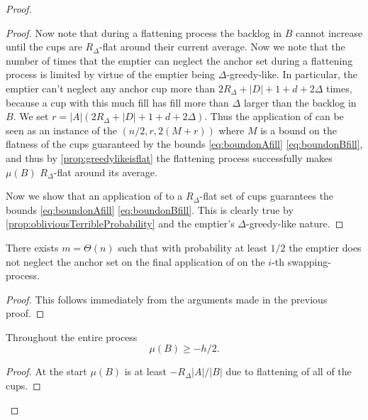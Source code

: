 \begin{proof}
\begin{proof}
  Now note that during a flattening process the backlog in $B$
  cannot increase until the cups are $R_\Delta$-flat around their
  current average. Now we note that the number of times that the
  emptier can neglect the anchor set during a flattening process
  is limited by virtue of the emptier being $\Delta$-greedy-like.
  In particular, the emptier can't neglect any anchor cup more
  than $2R_\Delta + |D| + 1 + d + 2\Delta$ times, because a cup
  with this much fill has fill more than $\Delta$ larger than the
  backlog in $B$. We set $r = |A|(2R_\Delta + |D| + 1 +
  d + 2\Delta)$. Thus the application of \flatalg can be seen as an instance of the
  $(n/2, r, 2(M + r))$ where $M$ is a bound on the flatness of
  the cups guaranteed by the bounds \eqref{eq:boundonAfill}
  \eqref{eq:boundonBfill}, and thus by
  \cref{prop:greedylikeisflat} the flattening process
  successfully makes $\mu(B)$ $R_\Delta$-flat around its average.

  Now we show that an application of \randalg to a
  $R_\Delta$-flat set of cups guarantees the bounds
  \eqref{eq:boundonAfill} \eqref{eq:boundonBfill}.
  This is clearly true by
  \cref{prop:obliviousTerribleProbability} and
  the emptier's $\Delta$-greedy-like nature.

\end{proof}

\begin{clm}
  \label{clm:thereexistsmsuchthat}
  There exists $m=\Theta(n)$ such that with probability
  at least $1/2$ the emptier does not neglect the anchor set on
  the final application of \randalg on the $i$-th
  swapping-process.
\end{clm}
\begin{proof}
  This follows immediately from the arguments made in the
  previous proof.
\end{proof}


\begin{clm}
  \label{clm:muBdoesntSinkTooLow}
  Throughout the entire process
  $$\mu(B) \ge -h/2.$$
\end{clm}
\begin{proof}

  At the start $\mu(B)$ is at least $-R_\Delta |A|/|B|$ due to flattening
  of all of the cups.


\end{proof}
\end{proof}
